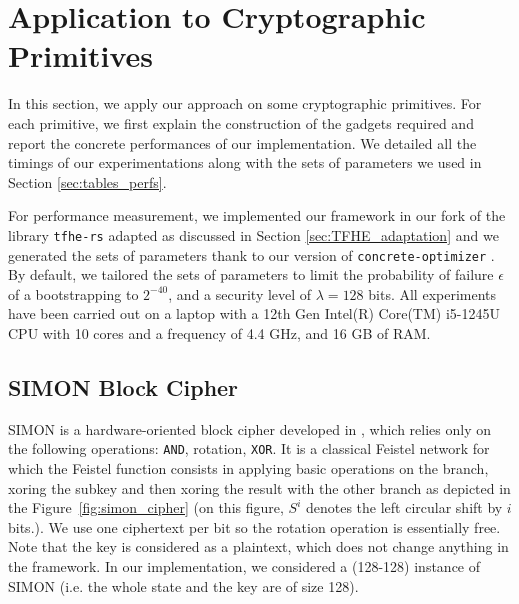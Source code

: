 
\section{Application to Cryptographic Primitives}
\label{sec:p_encodings_implementations}


In this section, we apply our approach on some cryptographic primitives. For each primitive, we first explain the construction of the gadgets required and report the concrete performances of our implementation. We detailed all the timings of our experimentations along with the sets of parameters we used in Section \ref{sec:tables_perfs}.

For performance measurement, we implemented our framework in our fork of the library \texttt{tfhe-rs} \cite{tfhe-rs} adapted as discussed in Section \ref{sec:TFHE_adaptation} and we generated the sets of parameters thank to our version of \texttt{concrete-optimizer} \cite{concrete-optimizer}. By default, we tailored the sets of parameters to limit the probability of failure $\epsilon$ of a bootstrapping to $2^{-40}$, and a security level of $\lambda = 128$ bits. All experiments have been carried out on a laptop with a 12th Gen Intel(R) Core(TM) i5-1245U CPU with 10 cores and a frequency of 4.4 GHz, and 16 GB of RAM.


\subsection{SIMON Block Cipher}
\label{sec:simon}

SIMON is a hardware-oriented block cipher developed in \cite{simon}, which relies only on the following operations: \texttt{AND}, rotation, \texttt{XOR}. It is a classical Feistel network for which the Feistel function consists in applying basic operations on the branch, xoring the subkey and then xoring the result with the other branch as depicted in the Figure~\ref{fig:simon_cipher} (on this figure, $S^i$ denotes the left circular shift by $i$ bits.). We use one ciphertext per bit so the rotation operation is essentially free. Note that the key is considered as a plaintext, which does not change anything in the framework. In our implementation, we considered a (128-128) instance of SIMON (i.e. the whole state and the key are of size 128). 


% 

